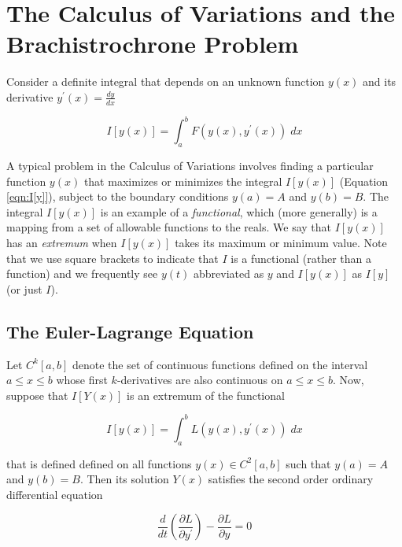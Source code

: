 \documentclass{article}
\theoremstyle{definition}
\begin{document}
\medskip
\section{The Calculus of Variations and the Brachistrochrone Problem}
\label{sec:cov}
Consider a definite integral that depends on an unknown function $y(x)$ and its derivative 
$y^{\prime}(x) = \frac{dy}{dx}$

\begin{equation}
I[y(x)] = \int_a^b F(y(x), y^{\prime}(x)) \; dx
\label{eqn:I[y]}
\end{equation}

\bigskip
\noindent
A typical problem in the Calculus of Variations involves finding
a particular function $y(x)$ that maximizes or minimizes the
integral $I[y(x)]$ (Equation \ref{eqn:I[y]}), subject to the
boundary conditions $y(a) = A$ and $y(b) = B$. The integral
$I[y(x)]$ is an example of a \emph{functional}, which (more
generally) is a mapping from a set of allowable functions to the
reals. We say that $I[y(x)]$ has an \emph{extremum} when
$I[y(x)]$ takes its maximum or minimum value. Note that we use
square brackets to indicate that $I$ is a functional (rather than
a function) and we frequently see $y(t)$ abbreviated as $y$ and
$I[y(x)]$ as $I[y]$ (or just $I$).

\subsection{The Euler-Lagrange Equation}
\label{subsec:euler-lagrange}
Let $C^k [a,b]$ denote the set of continuous functions defined on
the interval $a \leq x \leq b$ whose first $k$-derivatives are
also continuous on $a \leq x \leq b$. Now, suppose that $I[Y(x)]$
is an extremum of the functional

\medskip
\begin{equation*}
I[y(x)] = \int_a^b L(y(x), y^{\prime}(x)) \; dx
\end{equation*}

\bigskip
\noindent
that is defined defined on all functions $y(x) \in C^2 [a,b]$
such that $y(a) = A$ and $y(b) = B$.  Then its solution $Y(x)$
satisfies the second order ordinary differential equation


\bigskip
\begin{equation}
\dfrac{d}{dt} \left ( \dfrac{\partial L}{\partial y^{\prime}}
\right ) -  \dfrac{\partial L}{\partial y} = 0 
\label{eqn:euler-lagrange}
\end{equation}
\end{document}
